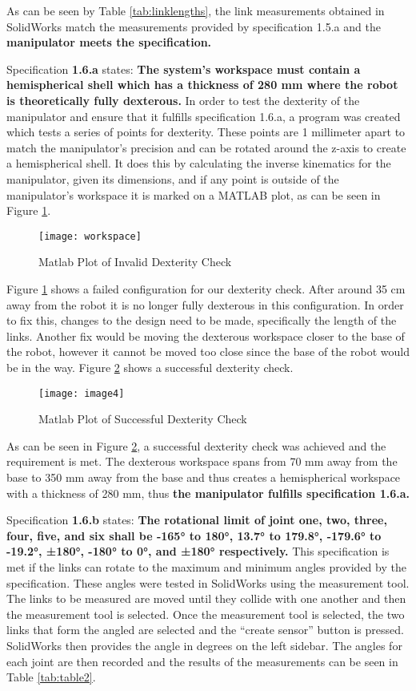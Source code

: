 As can be seen by Table \ref{tab:linklengths}, the link measurements obtained in SolidWorks match the measurements provided by specification 1.5.a and the \textbf{manipulator meets the specification. }

Specification \textbf{1.6.a} states: \textbf{The system’s workspace must contain a hemispherical shell which has a thickness of 280 mm where the robot is theoretically fully dexterous.} In order to test the dexterity of the manipulator and ensure that it fulfills specification 1.6.a, a program was created which tests a series of points for dexterity. These points are 1 millimeter apart to match the manipulator’s precision and can be rotated around the z-axis to create a hemispherical shell. It does this by calculating the inverse kinematics for the manipulator, given its dimensions, and if any point is outside of the manipulator’s workspace it is marked on a MATLAB plot, as can be seen in Figure \ref{fig:plot1}.

\begin{figure}[htp]
  \centering
  \texttt{[image: workspace]}
  \caption{Matlab Plot of Invalid Dexterity Check}
  \label{fig:plot1}
\end{figure}

Figure \ref{fig:plot1} shows a failed configuration for our dexterity check. After around 35 cm away from the robot it is no longer fully dexterous in this configuration. In order to fix this, changes to the design need to be made, specifically the length of the links. Another fix would be moving the dexterous workspace closer to the base of the robot, however it cannot be moved too close since the base of the robot would be in the way. Figure \ref{fig:plot2} shows a successful dexterity check.

\begin{figure}[htp]
  \centering
  \texttt{[image: image4]}
  \caption{Matlab Plot of Successful Dexterity Check}
  \label{fig:plot2}
\end{figure}

As can be seen in Figure \ref{fig:plot2}, a successful dexterity check was achieved and the requirement is met. The dexterous workspace spans from 70 mm away from the base to 350 mm away from the base and thus creates a hemispherical workspace with a thickness of 280 mm, thus \textbf{the manipulator fulfills specification 1.6.a.}

Specification \textbf{1.6.b} states: \textbf{The rotational limit of joint one, two, three, four, five, and six shall be -165° to 180°, 13.7° to 179.8°, -179.6° to -19.2°, ±180°, -180° to 0°, and ±180° respectively.} This specification is met if the links can rotate to the maximum and minimum angles provided by the specification. These angles were tested in SolidWorks using the measurement tool. The links to be measured are moved until they collide with one another and then the measurement tool is selected. Once the measurement tool is selected, the two links that form the angled are selected and the “create sensor” button is pressed. SolidWorks then provides the angle in degrees on the left sidebar. The angles for each joint are then recorded and the results of the measurements can be seen in Table \ref{tab:table2}.

